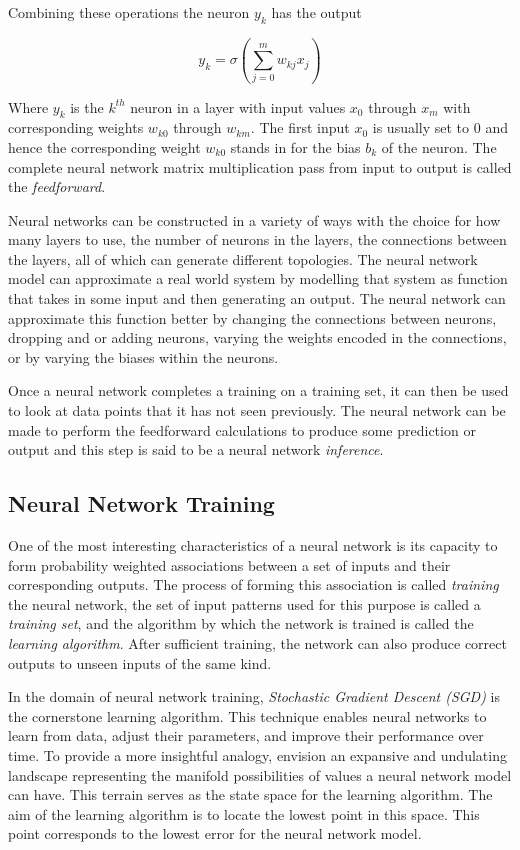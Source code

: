 Combining these operations the neuron $y_k$ has the output

\begin{equation}
	y_k = \sigma \left( \sum_{j=0}^m w_{kj} x_j \right)
\end{equation}

Where $y_k$ is the $k^{th}$ neuron in a layer with input values $x_0$ through $x_m$ with corresponding weights $w_{k0}$ through $w_{km}$. The first input $x_0$ is usually set to $0$ and hence the corresponding weight $w_{k0}$ stands in for the bias $b_k$ of the neuron. The complete neural network matrix multiplication pass from input to output is called the \textit{feedforward}.

Neural networks can be constructed in a variety of ways with the choice for how many layers to use, the number of neurons in the layers, the connections between the layers, all of which can generate different topologies. The neural network model can approximate a real world system by modelling that system as function that takes in some input and then generating an output. The neural network can approximate this function better by changing the connections between neurons, dropping and or adding neurons, varying the weights encoded in the connections, or by varying the biases within the neurons.

Once a neural network completes a training on a training set, it can then be used to look at data points that it has not seen previously. The neural network can be made to perform the feedforward calculations to produce some prediction or output and this step is said to be a neural network \textit{inference}.

\subsection{Neural Network Training}

One of the most interesting characteristics of a neural network is its capacity to form probability weighted associations between a set of inputs and their corresponding outputs. The process of forming this association is called \textit{training} the neural network, the set of input patterns used for this purpose is called a \textit{training set}, and the algorithm by which the network is trained is called the \textit{learning algorithm}. After sufficient training, the network can also produce correct outputs to unseen inputs of the same kind.

In the domain of neural network training, \textit{Stochastic Gradient Descent (SGD)} is the cornerstone learning algorithm. This technique enables neural networks to learn from data, adjust their parameters, and improve their performance over time. To provide a more insightful analogy, envision an expansive and undulating landscape representing the manifold possibilities of values a neural network model can have. This terrain serves as the state space for the learning algorithm. The aim of the learning algorithm is to locate the lowest point in this space. This point corresponds to the lowest error for the neural network model.

